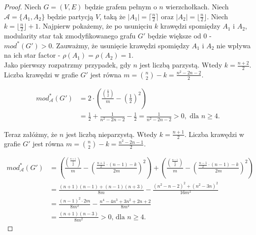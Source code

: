 \documentclass[letterpaper,12pt]{article}
\begin{document}
\begin{proof}
  Niech \(G=(V,E)\) będzie grafem pełnym o \(n\) wierzchołkach. Niech \(\mathcal{A} = \{A_1, A_2\}\) będzie partycją \(V\), taką że \(|A_1| = \lceil\frac{n}{2}\rceil\) oraz \(|A_2| = \lfloor\frac{n}{2}\rfloor\). Niech \(k = \lfloor\frac{n}{2}\rfloor + 1\). Najpierw pokażemy, że po usunięciu \(k\) krawędzi spomiędzy \(A_1\) i \(A_2\), modularity star tak zmodyfikowanego grafu \(G'\) będzie większe od 0 - \(mod^*(G') > 0\). Zauważmy, że usunięcie krawędzi spomiędzy \(A_1\) i \(A_2\) nie wpływa na ich star factor - \(\rho(A_1) = \rho(A_2) = 1\).\\

  Jako pierwszy rozpatrzmy przypadek, gdy \(n\) jest liczbą parzystą. Wtedy \(k = \frac{n+2}{2}\).
  Liczba krawędzi w grafie \(G'\) jest równa \(m = \binom{n}{2} - k = \frac{n^2-2n-2}{2}\).

  \begin{align*}
    mod_\mathcal{A}^*(G') & = 2\cdot\left(\frac{\binom{\frac{n}{2}}{2}}{m} - {\left(\frac{1}{2}\right)}^2\right)      \\
                          & = \frac{1}{2}+\frac{1}{n^2-2n-2}-\frac{1}{2}=\frac{1}{n^2-2n-2}>0, \text{ dla } n \geq 4.
  \end{align*}


  Teraz załóżmy, że \(n\) jest liczbą nieparzystą. Wtedy \(k = \frac{n+1}{2}\). Liczba krawędzi w grafie \(G'\) jest równa \(m = \binom{n}{2} - k = \frac{n^2-2n-1}{2}\).

  \begin{align*}
    mod_\mathcal{A}^*(G') & = \left(\frac{\binom{\frac{n+1}{2}}{2}}{m} - {\left(\frac{\frac{n+1}{2}\cdot(n-1)-k}{2m}\right)}^2\right) + \left(\frac{\binom{\frac{n-1}{2}}{2}}{m} - {\left(\frac{\frac{n-1}{2}\cdot(n-1)-k}{2m}\right)}^2\right) \\
                          & = \frac{(n+1)(n-1)+(n-1)(n+3)}{8m} - \frac{(n^2-n-2)^2 + (n^2-3n)^2}{16m^2}                                                                                                                                         \\
                          & = \frac{(n-1)^2\cdot 2m}{8m^2} - \frac{n^4-4n^3+3n^2+2n+2}{8m^2}                                                                                                                                                    \\
                          & = \frac{(n+1)(n-3)}{8m^2} > 0 \text{, dla } n \geq 4.
  \end{align*}


\end{proof}
\end{document}

